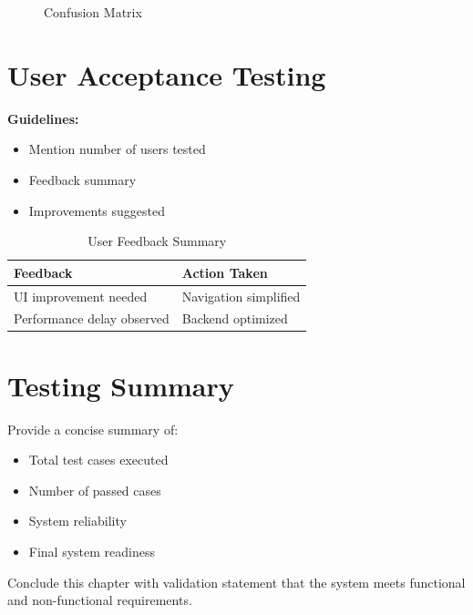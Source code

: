 \begin{figure}[h]
\centering
\caption{Confusion Matrix}
\end{figure}


\section{User Acceptance Testing}

\textbf{Guidelines:}
\begin{itemize}
    \item Mention number of users tested
    \item Feedback summary
    \item Improvements suggested
\end{itemize}

\begin{table}[h]
\centering
\caption{User Feedback Summary}
\begin{tabularx}{\textwidth}{|X|X|}
\hline
\textbf{Feedback} & \textbf{Action Taken} \\
\hline
UI improvement needed & Navigation simplified \\
\hline
Performance delay observed & Backend optimized \\
\hline
\end{tabularx}
\end{table}


\section{Testing Summary}

Provide a concise summary of:

\begin{itemize}
    \item Total test cases executed
    \item Number of passed cases
    \item System reliability
    \item Final system readiness
\end{itemize}

Conclude this chapter with validation statement that the system 
meets functional and non-functional requirements.

